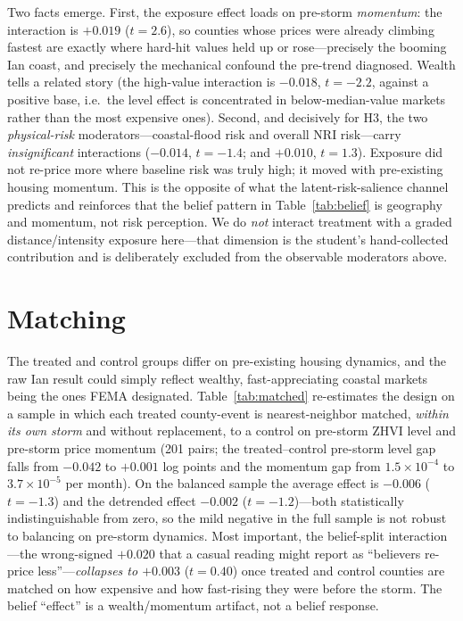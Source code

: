 \documentclass[12pt]{article}
\begin{document}
Two facts emerge. First, the exposure effect loads on pre-storm \emph{momentum}: the
interaction is $+0.019$ ($t=2.6$), so counties whose prices were already climbing fastest are
exactly where hard-hit values held up or rose---precisely the booming Ian coast, and precisely
the mechanical confound the pre-trend diagnosed. Wealth tells a related story (the high-value
interaction is $-0.018$, $t=-2.2$, against a positive base, i.e.\ the level effect is
concentrated in below-median-value markets rather than the most expensive ones). Second, and decisively for H3, the
two \emph{physical-risk} moderators---coastal-flood risk and overall NRI risk---carry
\emph{insignificant} interactions ($-0.014$, $t=-1.4$; and $+0.010$, $t=1.3$). Exposure did not
re-price more where baseline risk was truly high; it moved with pre-existing housing momentum.
This is the opposite of what the latent-risk-salience channel predicts and reinforces that the
belief pattern in Table~\ref{tab:belief} is geography and momentum, not risk perception. We do
\emph{not} interact treatment with a graded distance/intensity exposure here---that dimension is
the student's hand-collected contribution and is deliberately excluded from the observable
moderators above.

\section{Matching}\label{sec:match}
The treated and control groups differ on pre-existing housing dynamics, and the raw Ian result
could simply reflect wealthy, fast-appreciating coastal markets being the ones FEMA designated.
Table~\ref{tab:matched} re-estimates the design on a sample in which each treated county-event is
nearest-neighbor matched, \emph{within its own storm} and without replacement, to a control on
pre-storm ZHVI level and pre-storm price momentum (201 pairs; the treated--control pre-storm
level gap falls from $-0.042$ to $+0.001$ log points and the momentum gap from
$1.5\times10^{-4}$ to $3.7\times10^{-5}$ per month). On the balanced sample the average effect is
$-0.006$ ($t=-1.3$) and the detrended effect $-0.002$ ($t=-1.2$)---both statistically
indistinguishable from zero, so the mild negative in the full sample is not robust to balancing
on pre-storm dynamics. Most important, the belief-split interaction---the wrong-signed $+0.020$
that a casual reading might report as ``believers re-price less''---\emph{collapses to $+0.003$}
($t=0.40$) once treated and control counties are matched on how expensive and how fast-rising
they were before the storm. The belief ``effect'' is a wealth/momentum artifact, not a
belief response.
\end{document}
